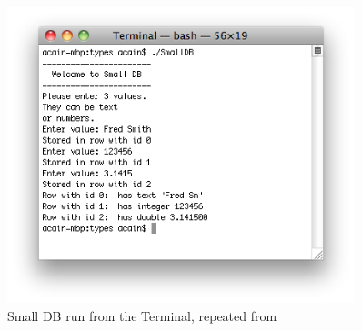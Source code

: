 \begin{figure}[h]
   \centering
   \includegraphics[width=0.9\textwidth]{./topics/type-decl/images/SmallDB} 
   \caption{Small DB run from the Terminal, repeated from }
   \label{fig:small-db-using}
\end{figure}


